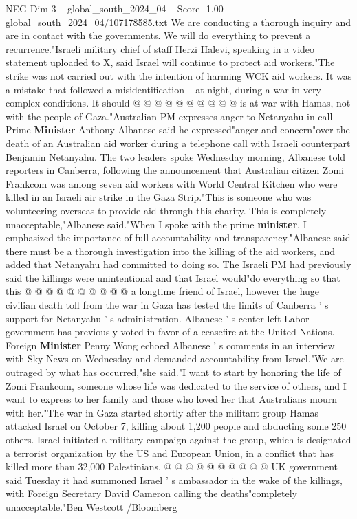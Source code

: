 \begin{textsample}{NEG Dim 3 – global\_south\_2024\_04 – Score -1.00 – global\_south\_2024\_04/107178585.txt}
We are conducting a thorough inquiry and are in contact with the governments.
We will do everything to prevent a recurrence."Israeli military chief of staff Herzi Halevi, speaking in a video statement uploaded to X, said Israel will continue to protect aid workers."The strike was not carried out with the intention of harming WCK aid workers.
It was a mistake that followed a misidentification -- at night, during a war in very complex conditions.
It should @ @ @ @ @ @ @ @ @ @ is at war with Hamas, not with the people of Gaza."Australian PM expresses anger to Netanyahu in call Prime \textbf{Minister} Anthony Albanese said he expressed"anger and concern"over the death of an Australian aid worker during a telephone call with Israeli counterpart Benjamin Netanyahu.
The two leaders spoke Wednesday morning, Albanese told reporters in Canberra, following the announcement that Australian citizen Zomi Frankcom was among seven aid workers with World Central Kitchen who were killed in an Israeli air strike in the Gaza Strip."This is someone who was volunteering overseas to provide aid through this charity.
This is completely unacceptable,"Albanese said."When I spoke with the prime \textbf{minister}, I emphasized the importance of full accountability and transparency."Albanese said there must be a thorough investigation into the killing of the aid workers, and added that Netanyahu had committed to doing so.
The Israeli PM had previously said the killings were unintentional and that Israel would"do everything so that this @ @ @ @ @ @ @ @ @ @ a longtime friend of Israel, however the huge civilian death toll from the war in Gaza has tested the limits of Canberra ' s support for Netanyahu ' s administration.
Albanese ' s center-left Labor government has previously voted in favor of a ceasefire at the United Nations.
Foreign \textbf{Minister} Penny Wong echoed Albanese ' s comments in an interview with Sky News on Wednesday and demanded accountability from Israel."We are outraged by what has occurred,"she said."I want to start by honoring the life of Zomi Frankcom, someone whose life was dedicated to the service of others, and I want to express to her family and those who loved her that Australians mourn with her."The war in Gaza started shortly after the militant group Hamas attacked Israel on October 7, killing about 1,200 people and abducting some 250 others.
Israel initiated a military campaign against the group, which is designated a terrorist organization by the US and European Union, in a conflict that has killed more than 32,000 Palestinians, @ @ @ @ @ @ @ @ @ @ UK government said Tuesday it had summoned Israel ' s ambassador in the wake of the killings, with Foreign Secretary David Cameron calling the deaths"completely unacceptable."Ben Westcott /Bloomberg

\end{textsample}
